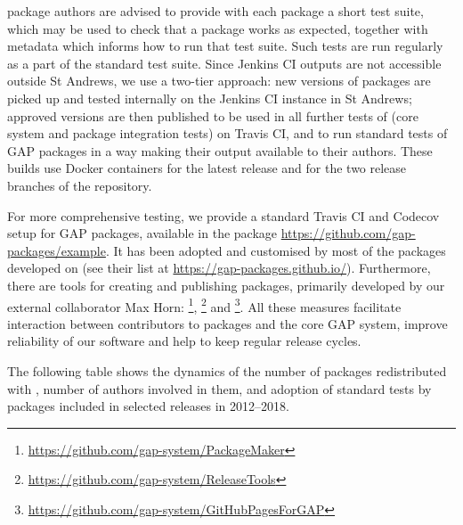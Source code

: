 \documentclass{deliverablereport}
\begin{document}
\GAP package authors are advised to provide with each package a short
test suite, which may be used to check that a package works as expected,
together with metadata which informs \GAP how to run that test suite.
Such tests are run regularly as a part of the standard \GAP test suite.
Since Jenkins CI outputs are not accessible outside St Andrews, we use
a two-tier approach: new versions of \GAP packages are picked up and
tested internally on the Jenkins CI instance in St Andrews; approved
versions are then published to be used in all further tests of \GAP
(core system and package integration tests) on Travis CI, and to run
standard tests of GAP packages in a way making their output available
to their authors. These builds use Docker containers for the latest
\GAP release and for the two release branches of the \GAP repository.

For more comprehensive testing, we provide a standard Travis CI and 
Codecov setup for GAP packages, available in the  package
\url{https://github.com/gap-packages/example}. It has been adopted and
customised by most of the \GAP packages developed on \GitHub (see their
list at \url{https://gap-packages.github.io/}). Furthermore, there are
tools for creating and publishing packages, primarily developed by our
external collaborator Max Horn: 
\footnote{\url{https://github.com/gap-system/PackageMaker}},
\footnote{\url{https://github.com/gap-system/ReleaseTools}}
and \footnote{\url{https://github.com/gap-system/GitHubPagesForGAP}}.
All these measures facilitate interaction between contributors to packages
and the core GAP system, improve reliability of our software and help to
keep regular release cycles.

The following table shows the dynamics of the number of packages redistributed
with \GAP, number of authors involved in them, and adoption of standard tests
by packages included in selected \GAP releases in 2012--2018.
\end{document}
